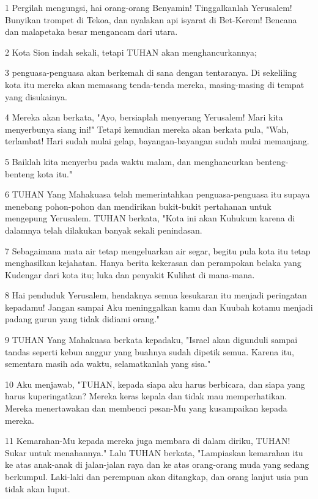 \par 1 Pergilah mengungsi, hai orang-orang Benyamin! Tinggalkanlah Yerusalem! Bunyikan trompet di Tekoa, dan nyalakan api isyarat di Bet-Kerem! Bencana dan malapetaka besar mengancam dari utara.
\par 2 Kota Sion indah sekali, tetapi TUHAN akan menghancurkannya;
\par 3 penguasa-penguasa akan berkemah di sana dengan tentaranya. Di sekeliling kota itu mereka akan memasang tenda-tenda mereka, masing-masing di tempat yang disukainya.
\par 4 Mereka akan berkata, "Ayo, bersiaplah menyerang Yerusalem! Mari kita menyerbunya siang ini!" Tetapi kemudian mereka akan berkata pula, "Wah, terlambat! Hari sudah mulai gelap, bayangan-bayangan sudah mulai memanjang.
\par 5 Baiklah kita menyerbu pada waktu malam, dan menghancurkan benteng-benteng kota itu."
\par 6 TUHAN Yang Mahakuasa telah memerintahkan penguasa-penguasa itu supaya menebang pohon-pohon dan mendirikan bukit-bukit pertahanan untuk mengepung Yerusalem. TUHAN berkata, "Kota ini akan Kuhukum karena di dalamnya telah dilakukan banyak sekali penindasan.
\par 7 Sebagaimana mata air tetap mengeluarkan air segar, begitu pula kota itu tetap menghasilkan kejahatan. Hanya berita kekerasan dan perampokan belaka yang Kudengar dari kota itu; luka dan penyakit Kulihat di mana-mana.
\par 8 Hai penduduk Yerusalem, hendaknya semua kesukaran itu menjadi peringatan kepadamu! Jangan sampai Aku meninggalkan kamu dan Kuubah kotamu menjadi padang gurun yang tidak didiami orang."
\par 9 TUHAN Yang Mahakuasa berkata kepadaku, "Israel akan digunduli sampai tandas seperti kebun anggur yang buahnya sudah dipetik semua. Karena itu, sementara masih ada waktu, selamatkanlah yang sisa."
\par 10 Aku menjawab, "TUHAN, kepada siapa aku harus berbicara, dan siapa yang harus kuperingatkan? Mereka keras kepala dan tidak mau memperhatikan. Mereka menertawakan dan membenci pesan-Mu yang kusampaikan kepada mereka.
\par 11 Kemarahan-Mu kepada mereka juga membara di dalam diriku, TUHAN! Sukar untuk menahannya." Lalu TUHAN berkata, "Lampiaskan kemarahan itu ke atas anak-anak di jalan-jalan raya dan ke atas orang-orang muda yang sedang berkumpul. Laki-laki dan perempuan akan ditangkap, dan orang lanjut usia pun tidak akan luput.
